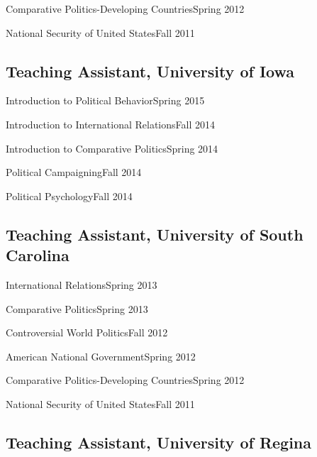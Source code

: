 \documentclass[10.5pt,]{article}
\providecommand{\tightlist}{%
	\setlength{\itemsep}{0pt}\setlength{\parskip}{0pt}}
\renewenvironment{itemize}{
	\begin{list}{}{
			\setlength{\leftmargin}{1.5em}
		}
	}{
	\end{list}
}
\begin{document}
\begin{itemize}
\tightlist
\item
  Comparative Politics-Developing Countries\hfill Spring 2012
\item
  National Security of United States\hfill Fall 2011
\end{itemize}

\subsection{Teaching Assistant, University of
Iowa}\label{teaching-assistant-university-of-iowa}

\begin{itemize}
\tightlist
\item
  Introduction to Political Behavior\hfill Spring 2015
\item
  Introduction to International Relations\hfill Fall 2014
\item
  Introduction to Comparative Politics\hfill Spring 2014
\item
  Political Campaigning\hfill Fall 2014
\item
  Political Psychology\hfill Fall 2014
\end{itemize}

\subsection{Teaching Assistant, University of South
Carolina}\label{teaching-assistant-university-of-south-carolina}

\begin{itemize}
\tightlist
\item
  International Relations\hfill Spring 2013
\item
  Comparative Politics\hfill Spring 2013
\item
  Controversial World Politics\hfill Fall 2012
\item
  American National Government\hfill Spring 2012
\item
  Comparative Politics-Developing Countries\hfill Spring 2012
\item
  National Security of United States\hfill Fall 2011
\end{itemize}

\subsection{Teaching Assistant, University of
Regina}\label{teaching-assistant-university-of-regina}
\end{document}

